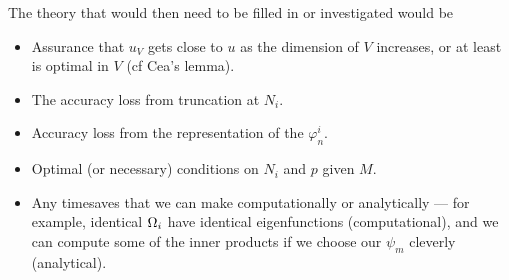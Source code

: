 The theory that would then need to be filled in or investigated would be
\begin{itemize}
	\item Assurance that $u_V$ gets close to $u$ as the dimension of $V$ increases, or at least is optimal in $V$ (cf Cea's lemma).
	\item The accuracy loss from truncation at $N_i$.
	\item Accuracy loss from the representation of the $\varphi_n^i$.
	\item Optimal (or necessary) conditions on $N_i$ and $p$ given $M$.
	\item Any timesaves that we can make computationally or analytically --- for example, identical $\Omega_i$ have identical eigenfunctions (computational), and we can compute some of the inner products if we choose our $\psi_m$ cleverly (analytical).
\end{itemize}